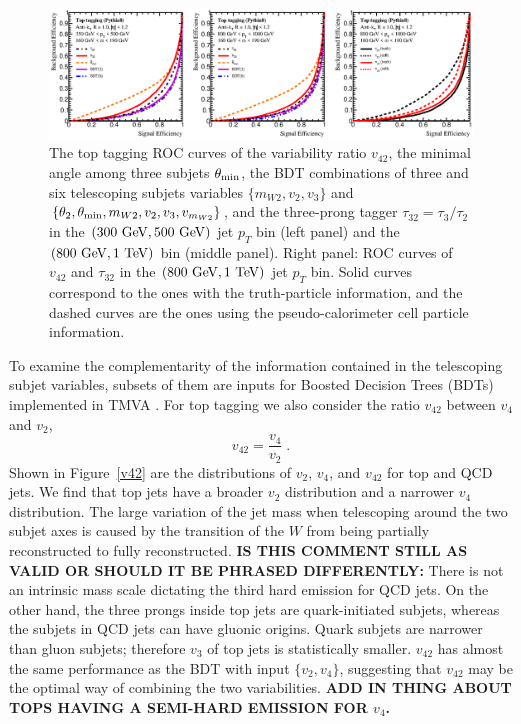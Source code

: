 \documentclass[aps,prl,floatfix,preprintnumbers,twocolumn,groupedaddress,nofootinbib]{revtex4-1}
\newcommand{\be}{\begin{equation}}
\newcommand{\ee}{\end{equation}}
\begin{document}
\begin{figure}
    \includegraphics[width=2\columnwidth]{plots/Top_ROCs_1.eps}
    \caption{The top tagging ROC curves of the variability ratio $v_{42}$, the minimal angle among three subjets $\theta_{\rm min}$, the BDT combinations of three and six telescoping subjets variables $\{m_{W2},v_2,v_3\}$ and $\{\theta_2,\theta_{\rm min},m_{W2},v_2,v_3,v_{m_{W2}}\}$, and the three-prong tagger $\tau_{32}=\tau_{3}/\tau_{2}$ in the $(300~{\rm GeV}, 500~{\rm GeV})$ jet $p_T$ bin (left panel) and the $(800~{\rm GeV}, 1~{\rm TeV})$ bin (middle panel). Right panel: ROC curves of $v_{42}$ and $\tau_{32}$ in the $(800~{\rm GeV}, 1~{\rm TeV})$ jet $p_T$ bin. Solid curves correspond to the ones with the truth-particle information, and the dashed curves are the ones using the pseudo-calorimeter cell particle information.}
\label{ROC_top}
\end{figure}

To examine the complementarity of the information contained in the telescoping subjet variables, subsets of them are inputs for Boosted Decision Trees (BDTs) implemented in \textsc{TMVA} \cite{Hocker:2007ht}. For top tagging we also consider the ratio $v_{42}$ between $v_4$ and $v_2$,
\be
    v_{42}=\frac{v_4}{v_2}\;.
\ee
Shown in Figure~\ref{v42} are the distributions of $v_2$, $v_4$, and $v_{42}$ for top and QCD jets. We find that top jets have a broader $v_2$ distribution and a narrower $v_4$ distribution. The large variation of the jet mass when telescoping around the two subjet axes is caused by the transition of the $W$ from being partially reconstructed to fully reconstructed. \textbf{IS THIS COMMENT STILL AS VALID OR SHOULD IT BE PHRASED DIFFERENTLY:} There is not an intrinsic mass scale dictating the third hard emission for QCD jets. On the other hand, the three prongs inside top jets are quark-initiated subjets, whereas the subjets in QCD jets can have gluonic origins. Quark subjets are narrower than gluon subjets; therefore $v_3$ of top jets is statistically smaller. $v_{42}$ has almost the same performance as the BDT with input $\{v_2,v_4\}$, suggesting that $v_{42}$ may be the optimal way of combining the two variabilities. \textbf{ADD IN THING ABOUT TOPS HAVING A SEMI-HARD EMISSION FOR $v_{4}$.}
\end{document}
